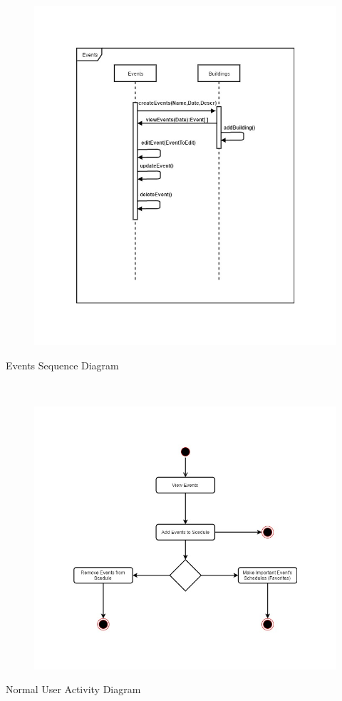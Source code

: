 \documentclass{article}
\begin{document}
    \mbox{}\\
    \bigskip
    \clearpage
    
    \begin{figure}[h!]
        \includegraphics[width=\textwidth]{Images/EventsSequence.jpg}
    \end{figure}
    Events Sequence Diagram
    
    \mbox{}\\
    \bigskip
    \clearpage
    
    \begin{figure}[h!]
        \includegraphics[width=\textwidth]{Images/ActivityDiagramUser.jpg}
    \end{figure}
    Normal User Activity Diagram
    
\end{document}
